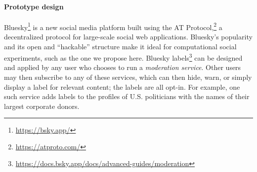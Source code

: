 \documentclass{article} %
\begin{document}

\paragraph{Prototype design}

Bluesky\footnote{\url{https://bsky.app/}} is a new social media platform built using the AT Protocol,\footnote{\url{https://atproto.com/}} a decentralized protocol for large-scale social web applications. 
Bluesky's popularity and its open and ``hackable'' structure make it ideal for computational social experiments, such as the one we propose here. 
Bluesky labels\footnote{\url{https://docs.bsky.app/docs/advanced-guides/moderation}} can be designed and applied by any user who chooses to run a \textit{moderation service}.
Other users may then subscribe to any of these services, which can then hide, warn, or simply display a label for relevant content; the labels are all opt-in.
For example, one such service adds labels to the profiles of U.S. politicians with the names of their largest corporate donors.



\end{document}
